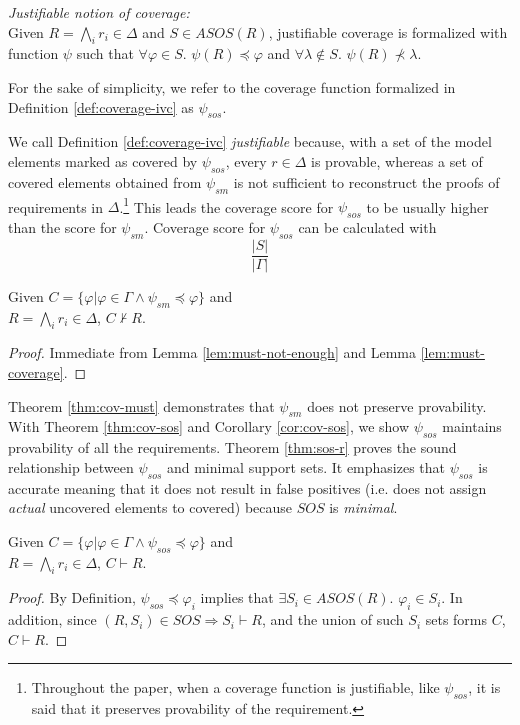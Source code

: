 \begin{definition} {\emph{Justifiable notion of coverage:}} \\
  \label{def:coverage-ivc}
  Given $R = \bigwedge_{i} {r_i \in \Delta}$ and $S \in ASOS(R)$, justifiable coverage is formalized with function $\psi$ such that  $\forall \varphi \in S$. $\psi (R) \preccurlyeq \varphi$
  and $\forall \lambda \notin S$. $\psi (R) \nprec \lambda$.
\end{definition}
\vspace{2mm}

For the sake of simplicity, we refer to the coverage function
formalized in Definition \ref{def:coverage-ivc} as $\psi_{sos}$.

We call Definition \ref{def:coverage-ivc} \emph{justifiable} because, with a set of the model elements marked as covered by $\psi_{sos}$, every $r \in \Delta$ is provable, whereas a set of covered elements obtained from $\psi_{sm}$ is not sufficient to reconstruct the proofs of requirements in $\Delta$.\footnote{Throughout the paper, when a coverage function is justifiable, like $\psi_{sos}$, it is said that it preserves provability of the requirement.}
This leads the coverage score for $\psi_{sos}$ to be usually higher than the score for $\psi_{sm}$. Coverage score for $\psi_{sos}$ can be calculated with $$\frac{|S|}{|\Gamma|}$$

\begin{theorem}
\label{thm:cov-must}
Given $C = \{\varphi | \varphi \in \Gamma \wedge \psi_{sm} \preccurlyeq \varphi \}$
and \\ $R = \bigwedge_{i} {r_i \in \Delta}$, $C \nvdash R$.
\end{theorem}
\begin{proof}
Immediate from Lemma \ref{lem:must-not-enough} and Lemma \ref{lem:must-coverage}.
\end{proof}
\vspace{2mm}
Theorem \ref{thm:cov-must} demonstrates that $\psi_{sm}$ does not preserve provability.
With Theorem \ref{thm:cov-sos} and Corollary \ref{cor:cov-sos},
we show $\psi_{sos}$ maintains provability of all the requirements.
Theorem \ref{thm:sos-r} proves the sound relationship
between $\psi_{sos}$ and minimal support sets.
It emphasizes that $\psi_{sos}$ is accurate meaning that it does not result in false positives
(i.e. does not assign \emph{actual} uncovered elements to covered) because $SOS$ is \emph{minimal}.

\begin{theorem}
\label{thm:cov-sos}
Given $C = \{\varphi | \varphi \in \Gamma \wedge  \psi_{sos} \preccurlyeq \varphi \}$
and \\ $R = \bigwedge_{i} {r_i \in \Delta}$, $C \vdash R$.
\end{theorem}
\begin{proof}
By Definition, $\psi_{sos} \preccurlyeq \varphi_i$ implies that $\exists S_i \in ASOS(R)$. $\varphi_i \in S_i$.
In addition, since $(R, S_i) \in SOS \Rightarrow S_i \vdash R$, and the union of such $S_i$ sets
forms $C$,
$C \vdash R$.
\end{proof}
\vspace{2mm}

